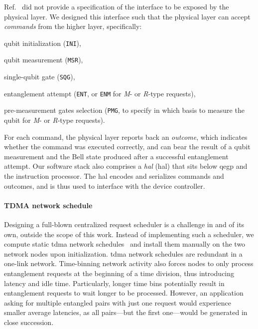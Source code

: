Ref.~\cite{dahlberg_2019_egp} did not provide a specification of the interface to be exposed by the
physical layer. We designed this interface such that the physical layer can accept \emph{commands}
from the higher layer, specifically:
%
\begin{inlinelist}
    \item qubit initialization (\texttt{INI}),
    \item qubit measurement (\texttt{MSR}),
    \item single-qubit gate (\texttt{SQG}),
    \item entanglement attempt (\texttt{ENT}, or \texttt{ENM} for \emph{M}- or \emph{R}-type
          requests),
    \item pre-measurement gates selection (\texttt{PMG}, to specify in which basis to measure the
          qubit for \emph{M}- or \emph{R}-type requests).
\end{inlinelist}
For each command, the physical layer reports back an \emph{outcome}, which indicates whether the
command was executed correctly, and can bear the result of a qubit measurement and the Bell state
produced after a successful entanglement attempt. Our software stack also comprises a
\emph{\acrlong{hal}} (\acrshort{hal}) that sits below \acrshort{qegp} and the instruction processor.
The \acrshort{hal} encodes and serializes commands and outcomes, and is thus used to interface with
the device controller.

\paragraph{TDMA network schedule}

Designing a full-blown centralized request scheduler is a challenge in and of its own, outside the
scope of this work. Instead of implementing such a scheduler, we compute static \acrshort{tdma}
network schedules~\cite{skrzypczyk_2021_arch} and install them manually on the two network nodes
upon initialization. \acrshort{tdma} network schedules are redundant in a one-link network.
Time-binning network activity also forces nodes to only process entanglement requests at the
beginning of a time division, thus introducing latency and idle time. Particularly, longer time bins
potentially result in entanglement requests to wait longer to be processed. However, an application
asking for multiple entangled pairs with just one request would experience smaller average
latencies, as all pairs—but the first one—would be generated in close succession.

